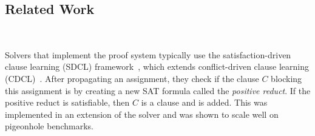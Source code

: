    




\subsection{Related Work}~\label{subsec:relatedwork}






Solvers that implement the \pr proof system typically use the
satisfaction-driven clause learning (SDCL) framework~\cite{sdcl}, which extends
conflict-driven clause learning (CDCL)~\cite{sat-handbook}. 
After propagating an assignment, they check if the clause $C$ blocking this
assignment is \pr by creating a new SAT formula called the \emph{positive
reduct}. If the positive reduct is satisfiable, then $C$ is a \pr clause and is
added. This was implemented in an extension of the solver \lingeling and was
shown to scale well on pigeonhole benchmarks.

